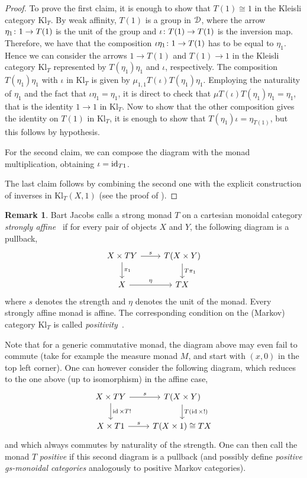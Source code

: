\documentclass[a4paper,UKenglish,numberwithinsect,cleveref, autoref, thm-restate]{lipics-v2021}
\theoremstyle{plain} %
\theoremstyle{definition} %
\newtheorem{myremark}[mytheorem]{Remark}
\begin{document}
\begin{proof}
	To prove the first claim, it is enough to show that $T(1)\cong 1$ in the Kleisli category $\mathrm{Kl}_T$.
	By weak affinity, $T(1)$ is a group in $\mD$, where the arrow $\freccia{1}{\eta_1}{T(1)}$ is the unit of the group and $\freccia{T(1)}{\iota}{T(1)}$ is the inversion map. Therefore, we have that the composition $\freccia{1}{\iota\eta_1}{T(1)}$ has to be equal to $\eta_1$.
	Hence we can consider the arrows $1\to T(1)$ and $T(1)\to 1$ in the Kleisli category $\mathrm{Kl}_T$ represented by $T(\eta_1)\eta_1$ and $\iota$, respectively. The composition $T(\eta_1)\eta_1$ with $\iota$ in $\mathrm{Kl}_T$ is given by $\mu_{1,1}T(\iota)T(\eta_1)\eta_1$. Employing the naturality of $\eta_1$ and the fact that $\iota\eta_1=\eta_1$, it is direct to check that $\mu T(\iota)T(\eta_1)\eta_1=\eta_1$, that is the identity $1\to 1$ in $\mathrm{Kl}_T$. Now to show that the other composition gives the identity on $T(1)$ in $\mathrm{Kl}_T$, it is enough to show that $T(\eta_1)\iota=\eta_{T(1)}$, but this follows by hypothesis.

	For the second claim, we can compose the diagram with the monad multiplication, obtaining $\iota=\id_{T1}$.
	
	The last claim follows by combining the second one with the explicit construction of inverses in $\mathrm{Kl}_T(X,1)$ (see the proof of ).
\end{proof}


\begin{myremark}
 Bart Jacobs calls a strong monad $T$ on a cartesian monoidal category \emph{strongly affine}~\cite{Jacobs16} if for every pair of objects $X$ and $Y$, the following diagram is a pullback,
 \[
  \begin{tikzcd}
   X \times TY \ar{d}{\pi_1} \ar{r}{s} & T(X\times Y) \ar{d}{T\pi_1} \\
   X \ar{r}{\eta} & TX
  \end{tikzcd}
 \]
where $s$ denotes the strength and $\eta$ denotes the unit of the monad. Every strongly affine monad is affine. 
The corresponding condition on the (Markov) category $\mathrm{Kl}_T$ is called \emph{positivity}~\cite[Section~2]{fritz2022dilations}.

Note that for a generic commutative monad, the diagram above may even fail to commute (take for example the measure monad $M$, and start with $(x,0)$ in the top left corner). One can however consider the following diagram, which reduces to the one above (up to isomorphism) in the affine case,
\[
 \begin{tikzcd}
   X \times TY \ar{d}{\id\times T!} \ar{r}{s} & T(X\times Y) \ar{d}{T(\id\times!)} \\
   X \times T1 \ar{r}{s} & T(X\times 1) \cong TX
  \end{tikzcd}
\]
and which always commutes by naturality of the strength.
One can then call the monad $T$ \emph{positive} if this second diagram is a pullback (and possibly define \emph{positive gs-monoidal categories} analogously to positive Markov categories). 
\end{myremark}



\end{document}

